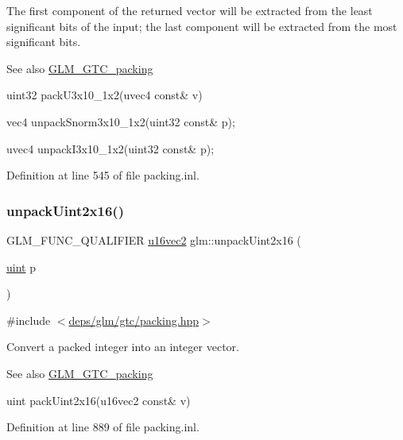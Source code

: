 The first component of the returned vector will be extracted from the least significant bits of the input; the last component will be extracted from the most significant bits.

\begin{DoxySeeAlso}{See also}
\hyperlink{group__gtc__packing}{G\+L\+M\+\_\+\+G\+T\+C\+\_\+packing} 

uint32 pack\+U3x10\+\_\+1x2(uvec4 const\& v) 

vec4 unpack\+Snorm3x10\+\_\+1x2(uint32 const\& p); 

uvec4 unpack\+I3x10\+\_\+1x2(uint32 const\& p); 
\end{DoxySeeAlso}


Definition at line 545 of file packing.\+inl.

\mbox{\label{group__gtc__packing_ga7778efa924e6efc386cb9f373bb06b72}} 
\subsubsection{\texorpdfstring{unpack\+Uint2x16()}{unpackUint2x16()}}
{\footnotesize\ttfamily G\+L\+M\+\_\+\+F\+U\+N\+C\+\_\+\+Q\+U\+A\+L\+I\+F\+I\+ER \hyperlink{group__gtc__type__precision_ga50bd2ceeb100a187e7c46f135269a0ec}{u16vec2} glm\+::unpack\+Uint2x16 (\begin{DoxyParamCaption}\item[{\hyperlink{group__core__precision_ga4fd29415871152bfb5abd588334147c8}{uint}}]{p }\end{DoxyParamCaption})}



{\ttfamily \#include $<$\hyperlink{gtc_2packing_8hpp}{deps/glm/gtc/packing.\+hpp}$>$}

Convert a packed integer into an integer vector.

\begin{DoxySeeAlso}{See also}
\hyperlink{group__gtc__packing}{G\+L\+M\+\_\+\+G\+T\+C\+\_\+packing} 

uint pack\+Uint2x16(u16vec2 const\& v) 
\end{DoxySeeAlso}


Definition at line 889 of file packing.\+inl.

\mbox{\label{group__gtc__packing_gab211ea5f8cf86f00efa4fd53cb302c82}} 
